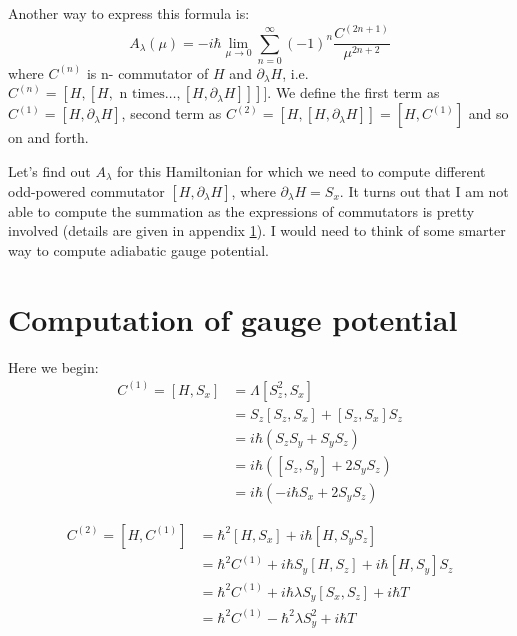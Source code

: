 \documentclass[11pt,a4paper]{article}
\begin{document}
Another way to express this formula is:
\begin{equation}
 A_{\lambda}(\mu) =  -i\hbar \lim_{\mu \rightarrow 0} \sum_{n=0}^{\infty}   (-1)^{n} \dfrac{ C^{(2n+1)}}{\mu^{2n+2}}
\end{equation}
where $C^{(n)}$ is n- commutator of $H$ and $\partial_{\lambda} H$, i.e. $C^{(n)}= [H, [H, \mbox{ n times} \ldots,[H, \partial_{\lambda} H ]]] ] $.  We define the first term as $C^{(1)}= [H, \partial_{\lambda}H]$, second term as $C^{(2)}= [H,[H, \partial_{\lambda}H]]= [H, C^{(1)}]$ and so on and forth.

Let's find out $A_{\lambda}$ for this Hamiltonian for which we need to compute different odd-powered commutator $[H, \partial_{\lambda} H]$, where $\partial_{\lambda} H=S_x$. It turns out that I am not able to compute the summation as the expressions of commutators is pretty involved (details are given in appendix \ref{sec.potn}). I would need to think of some smarter way to compute adiabatic gauge potential.



\appendix

\section{Computation of gauge potential}\label{sec.potn}

Here we begin:
\begin{align*}
C^{(1)}=[H,S_x] &= \Lambda  [S_z^2, S_x] \\
&= S_z[S_z, S_x] + [S_z, S_x] S_z \\
&= i \hbar (S_z S_y + S_y S_z) \\
&=i \hbar ([S_z, S_y] +  2 S_y S_z)\\
&=i \hbar (- i \hbar S_x +  2 S_y S_z)
\end{align*}

\begin{align*}
C^{(2)}=[H,C^{(1)}] &=     \hbar^2 [H,  S_x]  +  i \hbar[ H,   S_y S_z] \\
&= \hbar^2 C^{(1)}  +  i \hbar S_y[ H,    S_z] +  i \hbar[ H,   S_y ]S_z\\
&= \hbar^2 C^{(1)}  +  i \hbar \lambda S_y [ S_x,    S_z] + i \hbar T\\
&= \hbar^2 C^{(1)} - \hbar^2 \lambda S_y^2  + i \hbar T
\end{align*}
\end{document}
